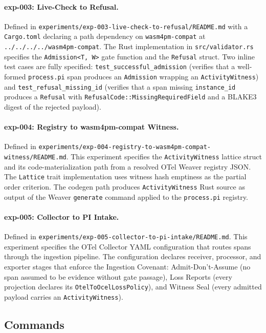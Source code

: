 \paragraph{exp-003: Live-Check to Refusal.}
Defined in \texttt{experiments/exp-003-live-check-to-refusal/README.md} with a \texttt{Cargo.toml}
declaring a path dependency on \texttt{wasm4pm-compat} at \texttt{../../../../wasm4pm-compat}.
The Rust implementation in \texttt{src/validator.rs} specifies the \texttt{Admission<T,\,W>}
gate function and the \texttt{Refusal} struct. Two inline test cases are fully specified:
\texttt{test\_successful\_admission} (verifies that a well-formed \texttt{process.pi} span
produces an \texttt{Admission} wrapping an \texttt{ActivityWitness}) and
\texttt{test\_refusal\_missing\_id} (verifies that a span missing \texttt{instance\_id}
produces a \texttt{Refusal} with \texttt{RefusalCode::MissingRequiredField} and a BLAKE3
digest of the rejected payload).

\paragraph{exp-004: Registry to wasm4pm-compat Witness.}
Defined in \texttt{experiments/exp-004-registry-to-wasm4pm-compat-witness/README.md}. This
experiment specifies the \texttt{ActivityWitness} lattice struct and its code-materialization
path from a resolved OTel Weaver registry JSON. The \texttt{Lattice} trait implementation
uses witness hash emptiness as the partial order criterion. The codegen path produces
\texttt{ActivityWitness} Rust source as output of the Weaver \texttt{generate} command applied
to the \texttt{process.pi} registry.

\paragraph{exp-005: Collector to PI Intake.}
Defined in \texttt{experiments/exp-005-collector-to-pi-intake/README.md}. This experiment
specifies the OTel Collector YAML configuration that routes spans through the ingestion pipeline.
The configuration declares receiver, processor, and exporter stages that enforce the Ingestion
Covenant: Admit-Don't-Assume (no span assumed to be evidence without gate passage), Loss Reports
(every projection declares its \texttt{OtelToOcelLossPolicy}), and Witness Seal (every admitted
payload carries an \texttt{ActivityWitness}).

\subsection{Commands}
\label{sec:otel-weaver-impl-commands}

